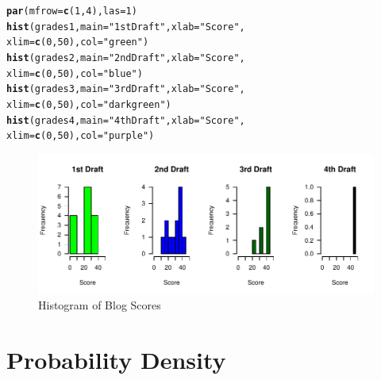 \documentclass{article}\usepackage[]{graphicx}\usepackage[]{color}
\makeatletter
\def\maxwidth{ %
  \ifdim\Gin@nat@width>\linewidth
    \linewidth
  \else
    \Gin@nat@width
  \fi
}
\newcommand{\hlnum}[1]{\textcolor[rgb]{0.686,0.059,0.569}{#1}}%
\newcommand{\hlstr}[1]{\textcolor[rgb]{0.192,0.494,0.8}{#1}}%
\newcommand{\hlstd}[1]{\textcolor[rgb]{0.345,0.345,0.345}{#1}}%
\newcommand{\hlkwc}[1]{\textcolor[rgb]{0.333,0.667,0.333}{#1}}%
\newcommand{\hlkwd}[1]{\textcolor[rgb]{0.737,0.353,0.396}{\textbf{#1}}}%
\newenvironment{kframe}{%
 \def\at@end@of@kframe{}%
 \ifinner\ifhmode%
  \def\at@end@of@kframe{\end{minipage}}%
  \begin{minipage}{\columnwidth}%
 \fi\fi%
 \def\FrameCommand##1{\hskip\@totalleftmargin \hskip-\fboxsep
 \colorbox{shadecolor}{##1}\hskip-\fboxsep
     \hskip-\linewidth \hskip-\@totalleftmargin \hskip\columnwidth}%
 \MakeFramed {\advance\hsize-\width
   \@totalleftmargin\z@ \linewidth\hsize
   \@setminipage}}%
 {\par\unskip\endMakeFramed%
 \at@end@of@kframe}
\newenvironment{knitrout}{}{} %
\makeatother
\begin{document}
\bigskip
\begin{knitrout}
\color{fgcolor}\begin{kframe}
\begin{alltt}
\hlkwd{par}\hlstd{(}\hlkwc{mfrow}\hlstd{=}\hlkwd{c}\hlstd{(}\hlnum{1}\hlstd{,}\hlnum{4}\hlstd{),} \hlkwc{las}\hlstd{=}\hlnum{1}\hlstd{)}
\hlkwd{hist}\hlstd{(grades1,} \hlkwc{main}\hlstd{=}\hlstr{"1st Draft"}\hlstd{,} \hlkwc{xlab}\hlstd{=}\hlstr{"Score"}\hlstd{,}
     \hlkwc{xlim}\hlstd{=}\hlkwd{c}\hlstd{(}\hlnum{0}\hlstd{,}\hlnum{50}\hlstd{),} \hlkwc{col}\hlstd{=}\hlstr{"green"}\hlstd{)}
\hlkwd{hist}\hlstd{(grades2,} \hlkwc{main}\hlstd{=}\hlstr{"2nd Draft"}\hlstd{,} \hlkwc{xlab}\hlstd{=}\hlstr{"Score"}\hlstd{,}
     \hlkwc{xlim}\hlstd{=}\hlkwd{c}\hlstd{(}\hlnum{0}\hlstd{,}\hlnum{50}\hlstd{),} \hlkwc{col}\hlstd{=}\hlstr{"blue"}\hlstd{)}
\hlkwd{hist}\hlstd{(grades3,} \hlkwc{main}\hlstd{=}\hlstr{"3rd Draft"}\hlstd{,} \hlkwc{xlab}\hlstd{=}\hlstr{"Score"}\hlstd{,}
     \hlkwc{xlim}\hlstd{=}\hlkwd{c}\hlstd{(}\hlnum{0}\hlstd{,}\hlnum{50}\hlstd{),} \hlkwc{col}\hlstd{=}\hlstr{"darkgreen"}\hlstd{)}
\hlkwd{hist}\hlstd{(grades4,} \hlkwc{main}\hlstd{=}\hlstr{"4th Draft"}\hlstd{,} \hlkwc{xlab}\hlstd{=}\hlstr{"Score"}\hlstd{,}
     \hlkwc{xlim}\hlstd{=}\hlkwd{c}\hlstd{(}\hlnum{0}\hlstd{,}\hlnum{50}\hlstd{),} \hlkwc{col}\hlstd{=}\hlstr{"purple"}\hlstd{)}
\end{alltt}
\end{kframe}\begin{figure}
\includegraphics[width=\maxwidth]{figure/scoreshist-1} \caption[Histogram of Blog Scores]{Histogram of Blog Scores}\label{fig:scoreshist}
\end{figure}


\end{knitrout}


\section{Probability Density}
\end{document}
